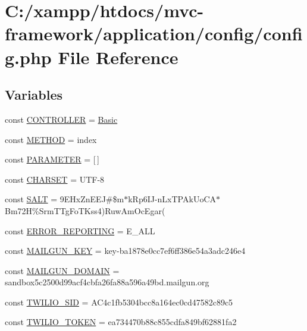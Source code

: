\hypertarget{config_8php}{}\section{C\+:/xampp/htdocs/mvc-\/framework/application/config/config.php File Reference}
\label{config_8php}
\subsection*{Variables}
\begin{DoxyCompactItemize}
\item 
const \hyperlink{config_8php_afa55a6839ec4ad32fc00879d78229356}{C\+O\+N\+T\+R\+O\+L\+L\+ER} = \textquotesingle{}\hyperlink{class_basic}{Basic}\textquotesingle{}
\item 
const \hyperlink{config_8php_a9d70943cac2f50debb62d2008a6e768d}{M\+E\+T\+H\+OD} = \textquotesingle{}index\textquotesingle{}
\item 
const \hyperlink{config_8php_a75466fbd8ac40be3d3c185c9974118e7}{P\+A\+R\+A\+M\+E\+T\+ER} = \mbox{[}$\,$\mbox{]}
\item 
const \hyperlink{config_8php_a4ca86066304d2cbb779bd8afd1efe17b}{C\+H\+A\+R\+S\+ET} = \textquotesingle{}U\+TF-\/8\textquotesingle{}
\item 
const \hyperlink{config_8php_a6d448b74f10f8080293b329a47a046b4}{S\+A\+LT} = \textquotesingle{}9\+E\+Hx\+Zn\+E\+E\+J\#\$m$\ast$k\+Rp6\+I\+J-\/n\+Lx\+T\+P\+Ak\+Uo\+C\+A$\ast$\+Bm72\+H\%\+Srm\+T\+Tg\+Fo\+T\+Kss4)\+Ruw\+Am\+Oc\+Egar(\textquotesingle{}
\item 
const \hyperlink{config_8php_a80c2f40a4ce1ad3cbfb1978239f63c31}{E\+R\+R\+O\+R\+\_\+\+R\+E\+P\+O\+R\+T\+I\+NG} = E\+\_\+\+A\+LL
\item 
const \hyperlink{config_8php_ad320bd8d96c22e094fb9b774f269aaef}{M\+A\+I\+L\+G\+U\+N\+\_\+\+K\+EY} = \textquotesingle{}key-\/ba1878e0cc7ef6ff386e54a3adc246e4\textquotesingle{}
\item 
const \hyperlink{config_8php_a2de069ac064bb137af53d99e3fcff3c8}{M\+A\+I\+L\+G\+U\+N\+\_\+\+D\+O\+M\+A\+IN} = \textquotesingle{}sandbox5c2500d99acf4cbfa26fa88a596a49bd.\+mailgun.\+org\textquotesingle{}
\item 
const \hyperlink{config_8php_a9b6aafbdebd605cd4fb6f5749b53e59f}{T\+W\+I\+L\+I\+O\+\_\+\+S\+ID} = \textquotesingle{}A\+C4c1fb5304bcc8a164ec0cd47582c89c5\textquotesingle{}
\item 
const \hyperlink{config_8php_a0477d5c66524299f08cae7376eb7884c}{T\+W\+I\+L\+I\+O\+\_\+\+T\+O\+K\+EN} = \textquotesingle{}ea734470b88c855cdfa849bf62881fa2\textquotesingle{}
\end{DoxyCompactItemize}


